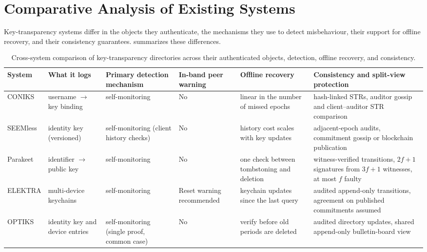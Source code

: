 \section{Comparative Analysis of Existing Systems}\label{sec:bg-compare}

Key-transparency systems differ in the objects they authenticate, the mechanisms they use to detect
misbehaviour, their support for offline recovery, and their consistency guarantees.
 summarizes these differences.

\begin{table}[t]
\centering
\caption[Cross-system comparison of key-transparency directories.]{Cross-system comparison of
key-transparency directories across their authenticated objects, detection, offline recovery, and
consistency.}
\label{tab:bg-compare}
\footnotesize
\setlength{\tabcolsep}{3pt}
\renewcommand{\arraystretch}{1.0}
\begin{tabular}{@{}>{\raggedright\arraybackslash}p{2.0cm}>{\raggedright\arraybackslash}p{2.3cm}>{\raggedright\arraybackslash}p{2.5cm}>{\raggedright\arraybackslash}p{1.35cm}>{\raggedright\arraybackslash}p{2.15cm}>{\raggedright\arraybackslash}p{2.6cm}@{}}
\toprule
System & What it logs & Primary detection mechanism & In-band peer warning &
  Offline recovery & Consistency and split-view protection \\
\midrule
CONIKS~\cite{melara2015coniks} & username $\to$ key binding & self-monitoring & No & linear in the number of missed epochs &
  hash-linked STRs, auditor gossip and client--auditor STR comparison \\
SEEMless~\cite{chase2019seemless} & identity key (versioned) & self-monitoring (client history checks) & No & history cost scales with key updates & adjacent-epoch audits, commitment gossip or blockchain publication \\
Parakeet~\cite{malvai2023parakeet} & identifier $\to$ public key & self-monitoring & No & one check between tombstoning and deletion & witness-verified transitions, $2f{+}1$ signatures from $3f{+}1$ witnesses, at most $f$ faulty \\
ELEKTRA \cite{len2023elektra} & multi-device keychains & self-monitoring & Reset warning recommended & keychain updates since the last query &
  audited append-only transitions, agreement on published commitments assumed \\
OPTIKS~\cite{optiks2024} & identity key and device entries & self-monitoring (single proof, common case) & No &
  verify before old periods are deleted & audited directory updates, shared append-only bulletin-board view \\

\end{tabular}
\end{table}
